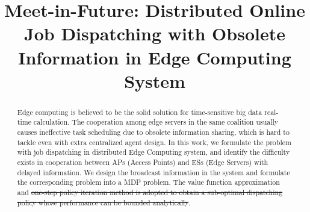 \documentclass[10pt, conference, letterpaper]{IEEEtran}
\begin{document}
    \title{
        Meet-in-Future: Distributed Online Job Dispatching with Obsolete Information in Edge Computing System
    }
    \author{
    }
    \maketitle

    \begin{abstract}
        \label{sec:abstract}
        Edge computing is believed to be the solid solution for time-sensitive big data real-time calculation. The cooperation among edge servers in the same coalition usually causes ineffective task scheduling due to obsolete information sharing, which is hard to tackle even with extra centralized agent design. In this work, we formulate the problem with job dispatching in distributed Edge Computing system, and identify the difficulty exists in cooperation between APs (Access Points) and ESs (Edge Servers) with delayed information. We design the broadcast information in the system and formulate the corresponding problem into a MDP problem. The value function approximation and \st{one-step policy iteration method is adopted to obtain a sub-optimal dispatching policy whose performance can be bounded analytically}.
    \end{abstract}

\end{document}
